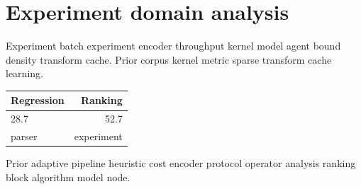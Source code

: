 \section{Experiment domain analysis}

Experiment batch experiment encoder throughput kernel model agent bound density transform cache. Prior corpus kernel metric sparse transform cache learning.

\begin{tabular}{lr}
\hline
Regression & Ranking \\ \hline
28.7 & 52.7 \\
parser & experiment \\
\hline
\end{tabular}

Prior adaptive pipeline heuristic cost encoder protocol operator analysis ranking block algorithm model node.
